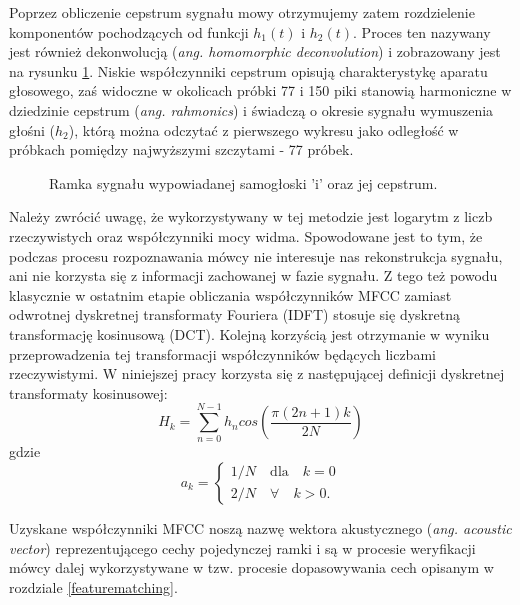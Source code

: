 Poprzez obliczenie cepstrum sygnału mowy otrzymujemy zatem rozdzielenie komponentów pochodzących od funkcji $h_1(t)$ i $h_2(t)$. Proces ten nazywany jest również dekonwolucją (\textit{ang. homomorphic deconvolution}) \cite{hdsp} i  zobrazowany jest na rysunku \ref{fig:e_cepstrum}. Niskie współczynniki cepstrum opisują charakterystykę aparatu głosowego, zaś widoczne w okolicach próbki 77 i 150 piki stanowią harmoniczne w dziedzinie cepstrum (\textit{ang. rahmonics}) i świadczą o okresie sygnału wymuszenia głośni ($h_2$), którą można odczytać z pierwszego wykresu jako odległość w próbkach pomiędzy najwyższymi szczytami - 77 próbek.

\begin{figure}
  \centering
  \begin{minipage}{.5\textwidth}
    \centering
    
  \end{minipage}%
  \begin{minipage}{.5\textwidth}
    \centering
    
  \end{minipage}
  \caption{Ramka sygnału wypowiadanej samogłoski 'i' oraz jej cepstrum.}
  \label{fig:e_cepstrum}
\end{figure}

Należy zwrócić uwagę, że wykorzystywany w tej metodzie jest logarytm z liczb rzeczywistych oraz współczynniki mocy widma. Spowodowane jest to tym, że podczas procesu rozpoznawania mówcy nie interesuje nas rekonstrukcja sygnału, ani nie korzysta się z informacji zachowanej w fazie sygnału. Z tego też powodu klasycznie w ostatnim etapie obliczania współczynników MFCC zamiast odwrotnej dyskretnej transformaty Fouriera (IDFT) stosuje się dyskretną transformację kosinusową (DCT). Kolejną korzyścią
jest otrzymanie w wyniku przeprowadzenia tej transformacji współczynników będących liczbami rzeczywistymi. W niniejszej pracy korzysta się z następującej definicji dyskretnej transformaty kosinusowej:
\begin{equation}
  \label{dct}
    H_k = \sum_{n=0}^{N-1} h_ncos\left(\frac{\pi (2n+1)k}{2N}\right)
\end{equation}
gdzie
\begin{equation}
    a_k = 
    \begin{cases}
        1/N \quad \text{dla}\quad k=0 \\
        2/N \quad \forall \quad k>0.
    \end{cases}
\end{equation}

Uzyskane współczynniki MFCC noszą nazwę wektora akustycznego (\textit{ang. acoustic vector}) reprezentującego cechy pojedynczej ramki i są w procesie weryfikacji mówcy dalej wykorzystywane w tzw. procesie dopasowywania cech opisanym w rozdziale \ref{featurematching}.

